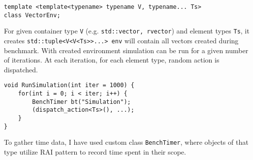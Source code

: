 \documentclass[inz, english, shortabstract]{iithesis}
\begin{document}
\begin{lstlisting}[caption=VectorEnv declaration]
template <template<typename> typename V, typename... Ts>
class VectorEnv;
\end{lstlisting}
For given container type {\tt V} (e.g. {\tt std::vector, rvector}) and element types {\tt Ts}, it creates 
\lstinline{std::tuple<V<V<Ts>>...> env}
will contain all vectors created during benchmark. 
With created environment simulation can be run for a given number of iterations.
At each iteration, for each element type, random action is dispatched.
\begin{lstlisting}[caption=RunSimulation]
void RunSimulation(int iter = 1000) {
	for(int i = 0; i < iter; i++) {
		BenchTimer bt("Simulation");
		(dispatch_action<Ts>(), ...);
	}
}
\end{lstlisting}
To gather time data, I have used custom class {\tt BenchTimer}, where objects of that type utilize RAI pattern to record time spent in their scope.

\clearpage
\end{document}
